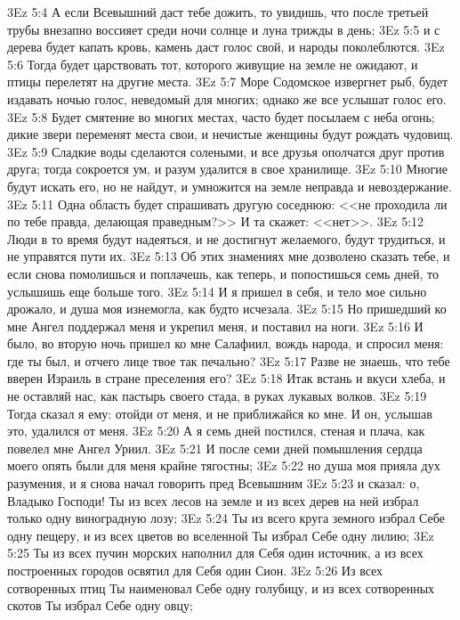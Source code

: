 \vs 3Ez 5:4 А если Всевышний даст тебе дожить, то увидишь, что после третьей трубы внезапно воссияет среди ночи солнце и луна трижды в день;
\vs 3Ez 5:5 и с дерева будет капать кровь, камень даст голос свой, и народы поколеблются.
\vs 3Ez 5:6 Тогда будет царствовать тот, которого живущие на земле не ожидают, и птицы перелетят на другие места.
\vs 3Ez 5:7 Море Содомское извергнет рыб, будет издавать ночью голос, неведомый для многих; однако же все услышат голос его.
\vs 3Ez 5:8 Будет смятение во многих местах, часто будет посылаем с неба огонь; дикие звери переменят места свои, и нечистые женщины будут рождать чудовищ.
\vs 3Ez 5:9 Сладкие воды сделаются солеными, и все друзья ополчатся друг против друга; тогда сокроется ум, и разум удалится в свое хранилище.
\vs 3Ez 5:10 Многие будут искать его, но не найдут, и умножится на земле неправда и невоздержание.
\vs 3Ez 5:11 Одна область будет спрашивать другую соседнюю: <<не проходила ли по тебе правда, делающая праведным?>> И та скажет: <<нет>>.
\vs 3Ez 5:12 Люди в то время будут надеяться, и не достигнут желаемого, будут трудиться, и не управятся пути их.
\vs 3Ez 5:13 Об этих знамениях мне дозволено сказать тебе, и если снова помолишься и поплачешь, как теперь, и попостишься семь дней, то услышишь еще больше того.
\vs 3Ez 5:14 И я пришел в себя, и тело мое сильно дрожало, и душа моя изнемогла, как будто исчезала.
\vs 3Ez 5:15 Но пришедший ко мне Ангел поддержал меня и укрепил меня, и поставил на ноги.
\vs 3Ez 5:16 И было, во вторую ночь пришел ко мне Салафиил, вождь народа, и спросил меня: где ты был, и отчего лице твое так печально?
\vs 3Ez 5:17 Разве не знаешь, что тебе вверен Израиль в стране преселения его?
\vs 3Ez 5:18 Итак встань и вкуси хлеба, и не оставляй нас, как пастырь своего стада, в руках лукавых волков.
\vs 3Ez 5:19 Тогда сказал я ему: отойди от меня, и не приближайся ко мне. И он, услышав это, удалился от меня.
\vs 3Ez 5:20 А я семь дней постился, стеная и плача, как повелел мне Ангел Уриил.
\vs 3Ez 5:21 И после семи дней помышления сердца моего опять были для меня крайне тягостны;
\vs 3Ez 5:22 но душа моя прияла дух разумения, и я снова начал говорить пред Всевышним
\vs 3Ez 5:23 и сказал: о, Владыко Господи! Ты из всех лесов на земле и из всех дерев на ней избрал только одну виноградную лозу;
\vs 3Ez 5:24 Ты из всего круга земного избрал Себе одну пещеру, и из всех цветов во вселенной Ты избрал Себе одну лилию;
\vs 3Ez 5:25 Ты из всех пучин морских наполнил для Себя один источник, а из всех построенных городов освятил для Себя один Сион.
\vs 3Ez 5:26 Из всех сотворенных птиц Ты наименовал Себе одну голубицу, и из всех сотворенных скотов Ты избрал Себе одну овцу;
